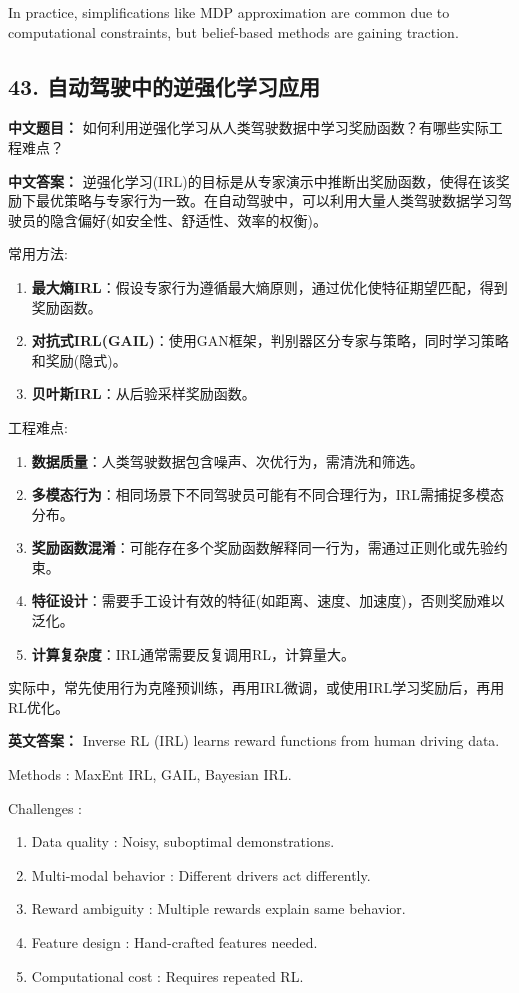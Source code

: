 \documentclass[10pt,a4paper]{ctexart}
\begin{document}
In practice, simplifications like MDP approximation are common due to computational constraints, but belief-based methods are gaining traction.

\subsection*{43. 自动驾驶中的逆强化学习应用}
\textbf{中文题目：} 如何利用逆强化学习从人类驾驶数据中学习奖励函数？有哪些实际工程难点？

\textbf{中文答案：}  
逆强化学习(IRL)的目标是从专家演示中推断出奖励函数，使得在该奖励下最优策略与专家行为一致。在自动驾驶中，可以利用大量人类驾驶数据学习驾驶员的隐含偏好(如安全性、舒适性、效率的权衡)。

 常用方法:
\begin{enumerate}
    \item \textbf{最大熵IRL}：假设专家行为遵循最大熵原则，通过优化使特征期望匹配，得到奖励函数。
    \item \textbf{对抗式IRL(GAIL)}：使用GAN框架，判别器区分专家与策略，同时学习策略和奖励(隐式)。
    \item \textbf{贝叶斯IRL}：从后验采样奖励函数。
\end{enumerate}

 工程难点:
\begin{enumerate}
    \item \textbf{数据质量}：人类驾驶数据包含噪声、次优行为，需清洗和筛选。
    \item \textbf{多模态行为}：相同场景下不同驾驶员可能有不同合理行为，IRL需捕捉多模态分布。
    \item \textbf{奖励函数混淆}：可能存在多个奖励函数解释同一行为，需通过正则化或先验约束。
    \item \textbf{特征设计}：需要手工设计有效的特征(如距离、速度、加速度)，否则奖励难以泛化。
    \item \textbf{计算复杂度}：IRL通常需要反复调用RL，计算量大。
\end{enumerate}

实际中，常先使用行为克隆预训练，再用IRL微调，或使用IRL学习奖励后，再用RL优化。

\textbf{英文答案：}  
Inverse RL (IRL) learns reward functions from human driving data.

 Methods : MaxEnt IRL, GAIL, Bayesian IRL.

 Challenges :
\begin{enumerate}
    \item Data quality : Noisy, suboptimal demonstrations.
    \item Multi-modal behavior : Different drivers act differently.
    \item Reward ambiguity : Multiple rewards explain same behavior.
    \item Feature design : Hand-crafted features needed.
    \item Computational cost : Requires repeated RL.
\end{enumerate}
\end{document}
